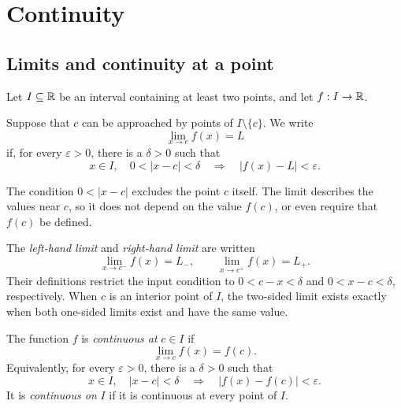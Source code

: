 \section{Continuity}
\label{sec:analysis-i:continuity}


\subsection{Limits and continuity at a point}

Let $I\subseteq\mathbb{R}$ be an interval
containing at least two points, and let $f:I\to\mathbb{R}$.

\begin{definition}
  \label{thm:analysis-i:function-limit}
  Suppose that $c$ can be approached by points of
  $I\setminus\{c\}$. We write
  \[
    \lim_{x\to c}f(x)=L
  \]
  if, for every $\varepsilon>0$, there is a $\delta>0$ such that
  \[
    x\in I,\quad 0<|x-c|<\delta
    \quad\Longrightarrow\quad |f(x)-L|<\varepsilon.
  \]
\end{definition}


The condition $0<|x-c|$ excludes the point $c$ itself. The limit describes
the values near $c$, so it does not depend on the value $f(c)$, or even
require that $f(c)$ be defined.


The \emph{left-hand limit} and \emph{right-hand limit} are written
\[
  \lim_{x\to c^-}f(x)=L_-,
  \qquad
  \lim_{x\to c^+}f(x)=L_+.
\]
Their definitions restrict the input condition to
$0<c-x<\delta$ and $0<x-c<\delta$, respectively. When $c$ is an interior
point of $I$, the two-sided limit exists exactly when both one-sided
limits exist and have the same value.

\begin{definition}[Continuity]
  \label{thm:analysis-i:continuity-at-a-point}
  The function $f$ is \emph{continuous at} $c\in I$ if
  \[
    \lim_{x\to c}f(x)=f(c).
  \]
  Equivalently, for every $\varepsilon>0$, there is a
  $\delta>0$ such that
  \[
    x\in I,\quad |x-c|<\delta
    \quad\Longrightarrow\quad |f(x)-f(c)|<\varepsilon.
  \]
  It is \emph{continuous on} $I$ if it is continuous at every point of $I$.
\end{definition}


